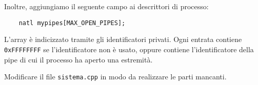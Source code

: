 Inoltre, aggiungiamo il seguente campo ai descrittori di processo:
\begin{verbatim}
    natl mypipes[MAX_OPEN_PIPES];
\end{verbatim}
L'array \`e indicizzato tramite gli identificatori privati. Ogni entrata contiene
\verb|0xFFFFFFFF| se l'identificatore non \`e usato, oppure contiene l'identificatore
della pipe di cui il processo ha aperto una estremit\`a.

Modificare il file \verb|sistema.cpp| in modo da realizzare le parti mancanti.
